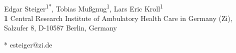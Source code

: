 \documentclass[10pt,letterpaper]{article}
\providecommand{\DIFaddbegin}{} %
\providecommand{\DIFaddend}{} %
\providecommand{\DIFdelbegin}{} %
\providecommand{\DIFdelend}{} %
\newcommand{\DIFscaledelfig}{0.5}
\newlength{\DIFdelgraphicswidth} %
\newlength{\DIFdelgraphicsheight} %
\newcommand{\DIFaddincludegraphics}[2][]{{\color{blue}\fbox{\DIFOincludegraphics[#1]{#2}}}} %
\newcommand{\DIFdelincludegraphics}[2][]{%
\sbox{\DIFdelgraphicsbox}{\DIFOincludegraphics[#1]{#2}}%
\settoboxwidth{\DIFdelgraphicswidth}{\DIFdelgraphicsbox} %
\settoboxtotalheight{\DIFdelgraphicsheight}{\DIFdelgraphicsbox} %
\scalebox{\DIFscaledelfig}{%
\parbox[b]{\DIFdelgraphicswidth}{\usebox{\DIFdelgraphicsbox}\\[-\baselineskip] \rule{\DIFdelgraphicswidth}{0em}}\llap{\resizebox{\DIFdelgraphicswidth}{\DIFdelgraphicsheight}{%
\setlength{\unitlength}{\DIFdelgraphicswidth}%
\begin{picture}(1,1)%
\thicklines\linethickness{2pt} %
{\color[rgb]{1,0,0}\put(0,0){\framebox(1,1){}}}%
{\color[rgb]{1,0,0}\put(0,0){\line( 1,1){1}}}%
{\color[rgb]{1,0,0}\put(0,1){\line(1,-1){1}}}%
\end{picture}%
}\hspace*{3pt}}} %
} %
\DeclareRobustCommand{\DIFaddbegin}{\DIFOaddbegin \let\includegraphics\DIFaddincludegraphics} %
\DeclareRobustCommand{\DIFaddend}{\DIFOaddend \let\includegraphics\DIFOincludegraphics} %
\DeclareRobustCommand{\DIFdelbegin}{\DIFOdelbegin \let\includegraphics\DIFdelincludegraphics} %
\DeclareRobustCommand{\DIFdelend}{\DIFOaddend \let\includegraphics\DIFOincludegraphics} %
\begin{document}
\vspace*{0.2in}

\begin{flushleft}
{\Large
\textbf\DIFdelbegin %
\DIFdelend \DIFaddbegin {} \DIFaddend %
}
\newline
\\
Edgar Steiger\textsuperscript{1*},
Tobias Mußgnug\textsuperscript{1},
Lars Eric Kroll\textsuperscript{1}%
\\
\bigskip
\textbf{1} Central Research Institute of Ambulatory Health Care in Germany (Zi),
Salzufer 8, D-10587 Berlin, Germany
\\
\bigskip

% 
%





* esteiger@zi.de

\end{flushleft}
\end{document}

